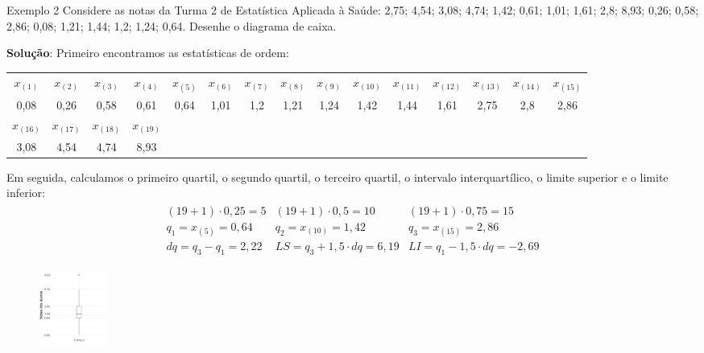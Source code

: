 \documentclass[8pt]{beamer}
\begin{document}
\begin{frame}{Exemplo 2}
Considere as notas da Turma 2 de Estatística Aplicada à Saúde: 2,75; 4,54; 3,08; 4,74; 1,42; 0,61; 1,01; 1,61; 2,8; 8,93; 0,26; 0,58; 2,86; 0,08; 1,21; 1,44; 1,2; 1,24; 0,64. Desenhe o diagrama de caixa.
\vspace{0.25cm}

\textbf{Solução}: Primeiro encontramos as estatísticas de ordem: 
{\tiny		
	\begin{table}[ht]
		\centering
		\begin{tabular}{ccccccccccccccc}
			\toprule[0.05cm]
			$x_{(1)}$ & $x_{(2)}$ & $x_{(3)}$ & $x_{(4)}$ & $x_{(5)}$ & $x_{(6)}$ & $x_{(7)}$ & $x_{(8)}$ & $x_{(9)}$ & $x_{(10)}$ & $x_{(11)}$ & $x_{(12)}$ & $x_{(13)}$ & $x_{(14)}$ & $x_{(15)}$ \\ 
			0,08 & 0,26 & 0,58 & 0,61 & 0,64 & 1,01 & 1,2 & 1,21 & 1,24 & 1,42 & 1,44 & 1,61 & 2,75 & 2,8 & 2,86 \\ \midrule[0.05cm]
			$x_{(16)}$ & $x_{(17)}$ & $x_{(18)}$ & $x_{(19)}$ &   &   &   &   &   &   &   &   &   &   &   \\ 
			3,08 & 4,54 & 4,74 & 8,93 &  &  &  &  &  &  &  &  &  &  &  \\ 
			\bottomrule[0.05cm]
		\end{tabular}
	\end{table}
}

Em seguida, calculamos o primeiro quartil, o segundo quartil, o terceiro quartil, o intervalo interquartílico, o limite superior e o limite inferior:
\begin{align*}
\begin{matrix}
(19+1)\cdot 0,25= 5 & (19+1)\cdot 0,5= 10 & (19+1)\cdot 0,75= 15\\
q_1= x_{(5)} = 0,64 & q_2 = x_{(10)} = 1,42 & q_3 = x_{(15)} = 2,86\\
dq= q_3-q_1 = 2,22 & LS= q_3+1,5\cdot dq = 6,19 &  LI = q_1-1,5\cdot dq=-2,69
\end{matrix}
\end{align*}
\begin{figure}
	\centering
	\includegraphics[height=2.5cm]{asim_boxplot_turma_2.png}
\end{figure}
\end{frame}
\end{document}
